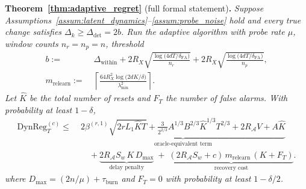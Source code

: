 \documentclass{article}
\newcommand{\cA}{\mathcal{A}}
\newcommand{\DynReg}{\mathrm{DynReg}}
\begin{document}
\noindent\textbf{Theorem~\ref{thm:adaptive_regret}} (full formal statement)\textbf{.}
\textit{Suppose Assumptions~\ref{assum:latent_dynamics}--\ref{assum:probe_noise} hold and every true change satisfies $\Delta_k \ge
\Delta_{\mathrm{det}} = 2b$.
Run the adaptive algorithm with probe rate $\mu$, window counts $n_r = n_p = n$, threshold}
\begin{equation}
\begin{aligned}
b :=\;& \Delta_{\mathrm{within}}
+ 2R_X\sqrt{\frac{\log\!\bigl(4dT/\delta_{\mathrm{FA}}\bigr)}{n_r}}
+ 2R_X\sqrt{\frac{\log\!\bigl(4dT/\delta_{\mathrm{FA}}\bigr)}{n_p}}, \\
m_{\mathrm{relearn}}
:=\;& \left\lceil
\frac{64 R_X^2 \log\!\bigl(2dK/\delta\bigr)}{\lambda_{\min}^2}
\right\rceil .
\end{aligned}
\label{eq:detector_threshold_main}
\end{equation}
\textit{Let $\hat K$ be the total number of resets and $F_T$ the number of false alarms.
With probability at least $1-\delta$,}
\begin{equation}
\begin{aligned}
\DynReg_T^{(c)} \le\;&
\underbrace{
2\beta^{(r,1)}\sqrt{2rL_1 \hat K T}
+ \frac{3}{2^{2/3}}A^{1/3}B^{2/3}\hat K^{1/3}T^{2/3}
+ 2R_{\cA} V + A\hat K
}_{\text{oracle-equivalent term}}
\\[0.5em]
&\quad
+ \underbrace{
2R_{\cA}S_w \, K \, D_{\max}
}_{\text{delay penalty}}
\;+\;
\underbrace{
(2R_{\cA}S_w + c)\, m_{\mathrm{relearn}}\, (K + F_T)
}_{\text{recovery cost}} .
\end{aligned}
\label{eq:adaptive_regret_bound}
\end{equation}
\textit{where $D_{\max} = (2n/\mu) + \tau_{\mathrm{burn}}$ and $F_T = 0$ with probability at least $1 - \delta/2$.}
\end{document}
